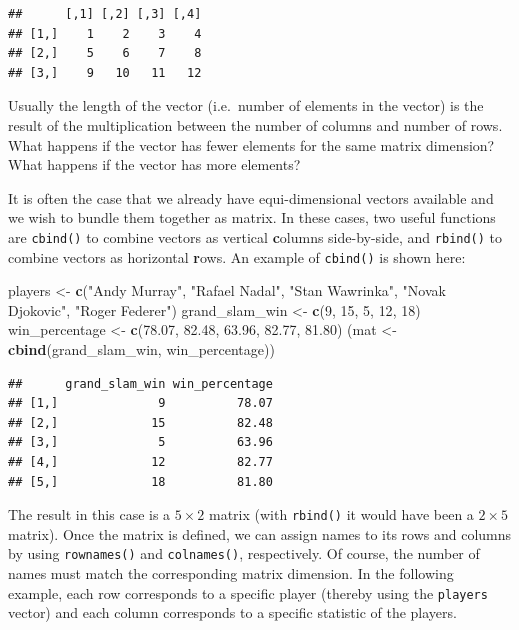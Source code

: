 \documentclass[12pt,]{krantz}
\newenvironment{Shaded}{\begin{snugshade}}{\end{snugshade}}
\newcommand{\KeywordTok}[1]{\textcolor[rgb]{0.27,0.27,0.27}{\textbf{#1}}}
\newcommand{\DecValTok}[1]{\textcolor[rgb]{0.06,0.06,0.06}{#1}}
\newcommand{\FloatTok}[1]{\textcolor[rgb]{0.06,0.06,0.06}{#1}}
\newcommand{\StringTok}[1]{\textcolor[rgb]{0.5,0.5,0.5}{#1}}
\newcommand{\NormalTok}[1]{#1}
\let\BeginKnitrBlock\begin \let\EndKnitrBlock\end
\begin{document}
\begin{verbatim}
##      [,1] [,2] [,3] [,4]
## [1,]    1    2    3    4
## [2,]    5    6    7    8
## [3,]    9   10   11   12
\end{verbatim}

\BeginKnitrBlock{rmdwarning}
Usually the length of the vector (i.e.~number of elements in the vector)
is the result of the multiplication between the number of columns and
number of rows. What happens if the vector has fewer elements for the
same matrix dimension? What happens if the vector has more elements?
\EndKnitrBlock{rmdwarning}

It is often the case that we already have equi-dimensional vectors
available and we wish to bundle them together as matrix. In these cases,
two useful functions are \texttt{cbind()} to combine vectors as vertical
\textbf{c}olumns side-by-side, and \texttt{rbind()} to combine vectors
as horizontal \textbf{r}ows. An example of \texttt{cbind()} is shown
here:

\begin{Shaded}
\begin{Highlighting}[]
\NormalTok{players <-}\StringTok{ }\KeywordTok{c}\NormalTok{(}\StringTok{"Andy Murray"}\NormalTok{, }\StringTok{"Rafael Nadal"}\NormalTok{, }\StringTok{"Stan Wawrinka"}\NormalTok{, }
             \StringTok{"Novak Djokovic"}\NormalTok{, }\StringTok{"Roger Federer"}\NormalTok{)}
\NormalTok{grand_slam_win <-}\StringTok{ }\KeywordTok{c}\NormalTok{(}\DecValTok{9}\NormalTok{, }\DecValTok{15}\NormalTok{, }\DecValTok{5}\NormalTok{, }\DecValTok{12}\NormalTok{, }\DecValTok{18}\NormalTok{)}
\NormalTok{win_percentage <-}\StringTok{ }\KeywordTok{c}\NormalTok{(}\FloatTok{78.07}\NormalTok{, }\FloatTok{82.48}\NormalTok{, }\FloatTok{63.96}\NormalTok{, }\FloatTok{82.77}\NormalTok{, }\FloatTok{81.80}\NormalTok{)}
\NormalTok{(mat <-}\StringTok{ }\KeywordTok{cbind}\NormalTok{(grand_slam_win, win_percentage))}
\end{Highlighting}
\end{Shaded}

\begin{verbatim}
##      grand_slam_win win_percentage
## [1,]              9          78.07
## [2,]             15          82.48
## [3,]              5          63.96
## [4,]             12          82.77
## [5,]             18          81.80
\end{verbatim}

The result in this case is a \(5 \times 2\) matrix (with
\texttt{rbind()} it would have been a \(2 \times 5\) matrix). Once the
matrix is defined, we can assign names to its rows and columns by using
\texttt{rownames()} and \texttt{colnames()}, respectively. Of course,
the number of names must match the corresponding matrix dimension. In
the following example, each row corresponds to a specific player
(thereby using the \texttt{players} vector) and each column corresponds
to a specific statistic of the players.
\end{document}
